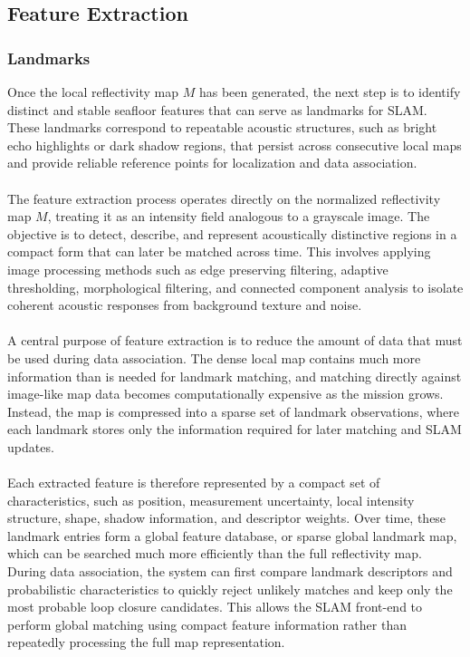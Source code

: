 \subsection{Feature Extraction}
\subsubsection{Landmarks}
Once the local reflectivity map $M$ has been generated, the next step is to identify distinct and stable seafloor features that can serve as landmarks for SLAM. These landmarks correspond to repeatable acoustic structures, such as bright echo highlights or dark shadow regions, that persist across consecutive local maps and provide reliable reference points for localization and data association.
\\ \\
The feature extraction process operates directly on the normalized reflectivity map $M$, treating it as an intensity field analogous to a grayscale image. The objective is to detect, describe, and represent acoustically distinctive regions in a compact form that can later be matched across time. This involves applying image processing methods such as edge preserving filtering, adaptive thresholding, morphological filtering, and connected component analysis to isolate coherent acoustic responses from background texture and noise.
\\ \\
A central purpose of feature extraction is to reduce the amount of data that must be used during data association. The dense local map contains much more information than is needed for landmark matching, and matching directly against image-like map data becomes computationally expensive as the mission grows. Instead, the map is compressed into a sparse set of landmark observations, where each landmark stores only the information required for later matching and SLAM updates.
\\ \\
Each extracted feature is therefore represented by a compact set of characteristics, such as position, measurement uncertainty, local intensity structure, shape, shadow information, and descriptor weights. Over time, these landmark entries form a global feature database, or sparse global landmark map, which can be searched much more efficiently than the full reflectivity map. During data association, the system can first compare landmark descriptors and probabilistic characteristics to quickly reject unlikely matches and keep only the most probable loop closure candidates. This allows the SLAM front-end to perform global matching using compact feature information rather than repeatedly processing the full map representation.
